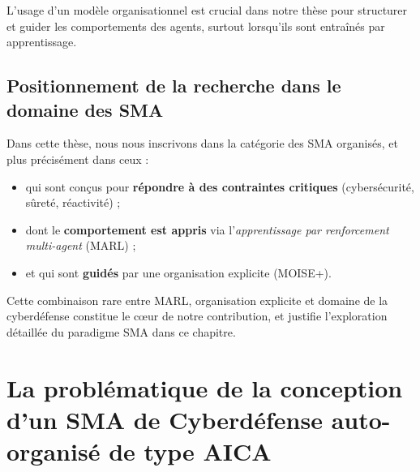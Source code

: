 \documentclass[ twoside,openright,titlepage,numbers=noenddot,headinclude,%
                footinclude=true,cleardoublepage=empty,abstractoff, %
                BCOR=5mm,paper=a4,fontsize=11pt,%
                french,american,%
                ]{scrreprt}
\begin{document}
L'usage d'un modèle organisationnel est crucial dans notre thèse pour structurer et guider les comportements des agents, surtout lorsqu'ils sont entraînés par apprentissage.

\vspace{0.5em}
\subsection*{Positionnement de la recherche dans le domaine des SMA}

Dans cette thèse, nous nous inscrivons dans la catégorie des SMA organisés, et plus précisément dans ceux :
\begin{itemize}
    \item qui sont conçus pour \textbf{répondre à des contraintes critiques} (cybersécurité, sûreté, réactivité) ;
    \item dont le \textbf{comportement est appris} via l'\textit{apprentissage par renforcement multi-agent} (MARL) ;
    \item et qui sont \textbf{guidés} par une organisation explicite (MOISE+).
\end{itemize}

Cette combinaison rare entre MARL, organisation explicite et domaine de la cyberdéfense constitue le cœur de notre contribution, et justifie l'exploration détaillée du paradigme SMA dans ce chapitre.



\section{La problématique de la conception d'un SMA de Cyberdéfense auto-organisé de type AICA}\label{sec:problematique-sma-aica}
\end{document}
